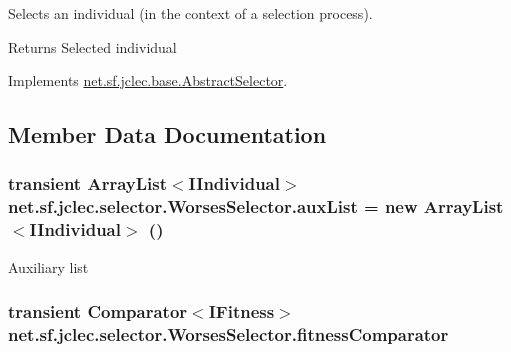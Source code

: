 Selects an individual (in the context of a selection process).

\begin{DoxyReturn}{Returns}
Selected individual
\end{DoxyReturn}
 

Implements \hyperlink{classnet_1_1sf_1_1jclec_1_1base_1_1_abstract_selector_aa2ccb539c608db9c14ebbc763807b95a}{net.\-sf.\-jclec.\-base.\-Abstract\-Selector}.



\subsection{Member Data Documentation}
\hypertarget{classnet_1_1sf_1_1jclec_1_1selector_1_1_worses_selector_ac94a7bc035ca4471e05c24acdad462e5}{
\subsubsection[{aux\-List}]{\setlength{\rightskip}{0pt plus 5cm}transient Array\-List$<${\bf I\-Individual}$>$ net.\-sf.\-jclec.\-selector.\-Worses\-Selector.\-aux\-List = new Array\-List$<${\bf I\-Individual}$>$ ()\hspace{0.3cm}{\ttfamily [protected]}}}\label{classnet_1_1sf_1_1jclec_1_1selector_1_1_worses_selector_ac94a7bc035ca4471e05c24acdad462e5}
Auxiliary list \hypertarget{classnet_1_1sf_1_1jclec_1_1selector_1_1_worses_selector_ad616da9c10e71aa53acc28300fc0c18e}{
\subsubsection[{fitness\-Comparator}]{\setlength{\rightskip}{0pt plus 5cm}transient Comparator$<${\bf I\-Fitness}$>$ net.\-sf.\-jclec.\-selector.\-Worses\-Selector.\-fitness\-Comparator\hspace{0.3cm}{\ttfamily [protected]}}}\label{classnet_1_1sf_1_1jclec_1_1selector_1_1_worses_selector_ad616da9c10e71aa53acc28300fc0c18e}

